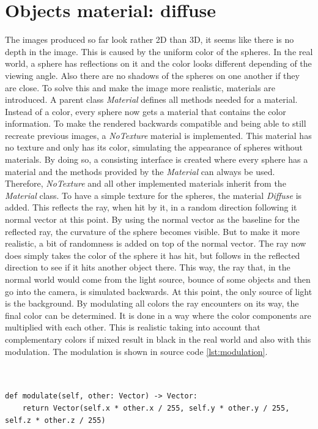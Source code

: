 \documentclass[12pt]{report}
\begin{document}
\chapter{Objects material: diffuse}
The images produced so far look rather 2D than 3D, it seems like there is no depth in the image. This is caused by the uniform color of the spheres. In the real world, a sphere has reflections on it and the color looks different depending of the viewing angle. Also there are no shadows of the spheres on one another if they are close. To solve this and make the image more realistic, materials are introduced. A parent class \textit{Material} defines all methods needed for a material. Instead of a color, every sphere now gets a material that contains the color information. To make the rendered backwards compatible and being able to still recreate previous images, a \textit{NoTexture} material is implemented. This material has no texture and only has its color, simulating the appearance of spheres without materials. By doing so, a consisting interface is created where every sphere has a material and the methods provided by the \textit{Material} can always be used. Therefore, \textit{NoTexture} and all other implemented materials inherit from the \textit{Material} class. To have a simple texture for the spheres, the material \textit{Diffuse} is added. This reflects the ray, when hit by it, in a random direction following it normal vector at this point. By using the normal vector as the baseline for the reflected ray, the curvature of the sphere becomes visible. But to make it more realistic, a bit of randomness is added on top of the normal vector. The ray now does simply takes the color of the sphere it has hit, but  follows in the reflected direction to see if it hits another object there. This way, the ray that, in the normal world would come from the light source, bounce of some objects and then go into the camera, is simulated backwards. At this point, the only source of light is the background. By modulating all colors the ray encounters on its way, the final color can be determined. It is done in a way where the color components are multiplied with each other. This is realistic taking into account that complementary colors if mixed result in black in the real world and also with this modulation. The modulation is shown in source code \ref{lst:modulation}. \\\\\\
\begin{lstlisting}[caption={Modulating two colors}, label=lst:modulation, style=mystyle]
def modulate(self, other: Vector) -> Vector:
    return Vector(self.x * other.x / 255, self.y * other.y / 255, self.z * other.z / 255)
\end{lstlisting}
\end{document}
